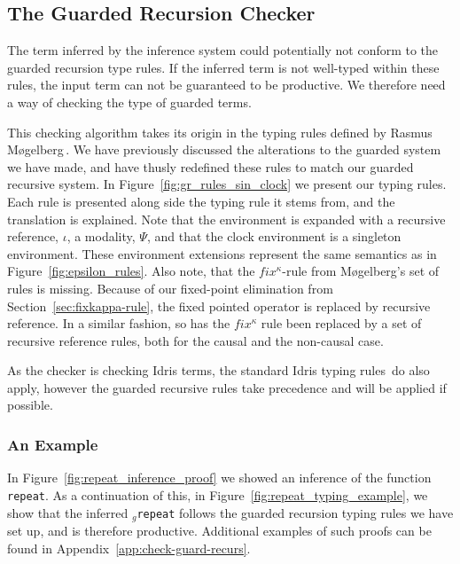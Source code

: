 \subsection{The Guarded Recursion Checker}
The term inferred by the inference system could potentially not conform to the
guarded recursion type rules. If the inferred term is not well-typed within
these rules, the input term can not be guaranteed to be productive. We
therefore need a way of checking the type of guarded terms.

This checking algorithm takes its origin in the typing rules defined by Rasmus
M\o gelberg\,\citep{Mogelberg:2014}. We have previously discussed the alterations
to the guarded system we have made, and have thusly redefined these rules to
match our guarded recursive system. In Figure~\ref{fig:gr_rules_sin_clock} we
present our typing rules. Each rule is presented along side the typing rule it
stems from, and the translation is explained. Note that the
environment is expanded with a recursive reference, $\iota$, a modality, $\Psi$,
and that the clock environment is a singleton environment. These environment extensions
represent the same semantics as in Figure~\ref{fig:epsilon_rules}. Also note,
that the $fix^\kappa$-rule from M\o gelberg's set of rules is missing. Because of our
fixed-point elimination from Section~\ref{sec:fixkappa-rule}, the fixed pointed
operator is replaced by recursive reference. In a similar fashion, so has the
$fix^\kappa$ rule been replaced by a set of recursive reference rules, both for
the causal and the non-causal case.

As the checker is checking Idris terms, the standard Idris typing
rules\,\citep{BradyIdrisImpl13} do also apply, however the guarded recursive
rules take precedence and will be applied if possible.


\subsubsection{An Example}
In Figure~\ref{fig:repeat_inference_proof} we showed an inference of the
function \texttt{repeat}. As a continuation of this, in Figure~\ref{fig:repeat_typing_example}, we show that the inferred
$_g$\texttt{repeat} follows the guarded recursion typing rules we have set up, and is therefore
productive. Additional examples of such proofs can be found in Appendix~\ref{app:check-guard-recurs}.


